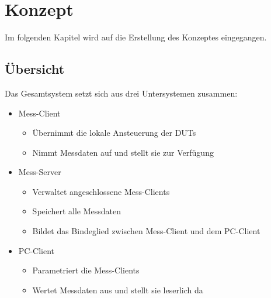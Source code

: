 \chapter{Konzept}
\label{chapter_Konzept}

Im folgenden Kapitel wird auf die Erstellung des Konzeptes eingegangen.

\section{Übersicht}
\label{section_Teststand}

Das Gesamtsystem setzt sich aus drei Untersystemen zusammen:

\begin{itemize}

\item Mess-Client
\begin{itemize}
\item Übernimmt die lokale Ansteuerung der \acp{DUT}
\item Nimmt Messdaten auf und stellt sie zur Verfügung
\end{itemize}

\item Mess-Server
\begin{itemize}
\item Verwaltet angeschlossene Mess-Clients
\item Speichert alle Messdaten
\item Bildet das Bindeglied zwischen Mess-Client und dem PC-Client
\end{itemize}

\item PC-Client
\begin{itemize}
\item Parametriert die Mess-Clients
\item Wertet Messdaten aus und stellt sie leserlich da
\end{itemize}

\end{itemize}


